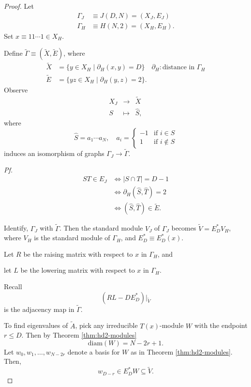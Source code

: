 \documentclass[
]{book}
\theoremstyle{definition}
\theoremstyle{definition}
\theoremstyle{definition}
\theoremstyle{definition}
\theoremstyle{remark}
\begin{document}
\begin{proof}
Let
\begin{align}
\Gamma_J & \equiv J(D,N) = (X_J, E_J)\\
\Gamma_H & \equiv H(N,2) = (X_H, E_H).
\end{align}
Set \(x \equiv 11\cdots 1 \in X_H\).

Define \(\tilde{\Gamma} \equiv (\tilde{X}, \tilde{E})\), where
\begin{align}
\tilde{X} & = \{y\in X_H \mid \partial_H(x,y) = D\} \quad \partial_H:\text{distance in }\Gamma_H\\
\tilde{E} & = \{yz\in X_H \mid \partial_H(y,z) = 2\}.
\end{align}
Observe
\begin{align}
X_J & \to & \tilde{X}\\
S & \mapsto & \hat{S},
\end{align}
where
\[\hat{S} = a_1\cdots a_N, \quad a_i = \begin{cases} -1 & \text{if }i\in S\\ 1 & \text{if }i\not\in S \end{cases}\]
induces an isomorphism of graphs \(\Gamma_J \to \tilde{\Gamma}\).

\emph{Pf.}
\begin{align}
ST \in E_J &\Leftrightarrow |S\cap T| = D-1\\
& \Leftrightarrow \partial_H(\hat{S}, \hat{T}) = 2\\
& \Leftrightarrow (\hat{S}, \hat{T})\in \tilde{E}.
\end{align}

Identify, \(\Gamma_J\) with \(\tilde{\Gamma}\). Then the standard module \(V_J\) of \(\Gamma_J\) becomes \(\tilde{V} = E^*_DV_H\), where \(V_H\) is the standard module of \(\Gamma_H\), and \(E^*_D \equiv E^*_D(x)\).

Let \(R\) be the raising matrix with respect to \(x\) in \(\Gamma_H\), and

let \(L\) be the lowering matrix with respect to \(x\) in \(\Gamma_H\).

Recall
\[(RL - DE^*_D) |_{\tilde{V}}\]
is the adjacency map in \(\tilde{\Gamma}\).

To find eigenvalues of \(\tilde{A}\), pick any irreducible \(T(x)\)-module \(W\) with the endpoint \(r\leq D\). Then by Theorem \ref{thm:hd2-modules}
\[\text{diam}(W) = N-2r+1.\]
Let \(w_0, w_1, \ldots, w_{N-2r}\) denote a basis for \(W\) as in Theorem \ref{thm:hd2-modules}. Then,
\[w_{D-r} \in E^*_DW \subseteq \tilde{V}.\]


\end{proof}
\end{document}
